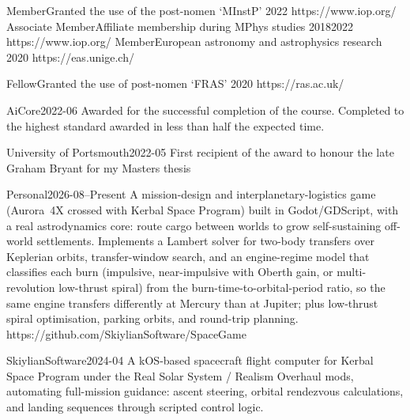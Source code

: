 {Member}{Granted the use of the post-nomen `MInstP'}
{2022}{}
{}
{https://www.iop.org/}
\iflean\else
{}
{Associate Member}{Affiliate membership during MPhys studies}
{2018}{2022}
{}
{https://www.iop.org/}
\fi
\ifshowextra
{}
{Member}{European astronomy and astrophysics research}
{2020}{}
{}
{https://eas.unige.ch/}
\fi

{Fellow}{Granted the use of post-nomen `FRAS'}
{2020}{}
{}
{https://ras.ac.uk/}


{AiCore}{2022-06}
{Awarded for the successful completion of the course. Completed to the highest standard awarded in less than half the expected time.}

{University of Portsmouth}{2022-05}
{First recipient of the award to honour the late Graham Bryant for my Masters thesis}



\ifspace
{}
{Personal}{2026-08--Present}
{A mission-design and interplanetary-logistics game (Aurora~4X crossed with Kerbal Space Program) built in Godot/GDScript, with a real astrodynamics core: route cargo between worlds to grow self-sustaining off-world settlements. Implements a Lambert solver for two-body transfers over Keplerian orbits, transfer-window search, and an engine-regime model that classifies each burn (impulsive, near-impulsive with Oberth gain, or multi-revolution low-thrust spiral) from the burn-time-to-orbital-period ratio, so the same engine transfers differently at Mercury than at Jupiter; plus low-thrust spiral optimisation, parking orbits, and round-trip planning.}
{https://github.com/SkiylianSoftware/SpaceGame}

{SkiylianSoftware}{2024-04}
{A kOS-based spacecraft flight computer for Kerbal Space Program under the Real Solar System / Realism Overhaul mods, automating full-mission guidance: ascent steering, orbital rendezvous calculations, and landing sequences through scripted control logic.}
{}

